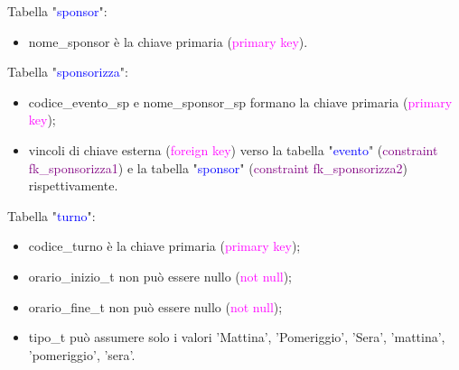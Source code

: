 \documentclass{article}
\begin{document}
     \begin{flushleft}
        Tabella "\textcolor{blue}{sponsor}": \\
        \begin{itemize}
            \item nome\_sponsor è la chiave primaria (\textcolor{magenta}{primary key}). \\
        \end{itemize}        
    \end{flushleft}

    \newpage
    \begin{flushleft}
        Tabella "\textcolor{blue}{sponsorizza}": \\
        \begin{itemize}
            \item codice\_evento\_sp e nome\_sponsor\_sp formano la chiave primaria (\textcolor{magenta}{primary key});
            \item vincoli di chiave esterna (\textcolor{magenta}{foreign key}) verso la tabella "\textcolor{blue}{evento}" (\textcolor{purple}{constraint fk\_sponsorizza1}) e la tabella "\textcolor{blue}{sponsor}" (\textcolor{purple}{constraint fk\_sponsorizza2}) rispettivamente.
        \end{itemize}        
    \end{flushleft}

    \begin{flushleft}
        Tabella "\textcolor{blue}{turno}": \\
        \begin{itemize}
            \item codice\_turno è la chiave primaria (\textcolor{magenta}{primary key}); \\
            \item orario\_inizio\_t non può essere nullo (\textcolor{magenta}{not null}); \\
            \item orario\_fine\_t non può essere nullo (\textcolor{magenta}{not null}); \\
            \item tipo\_t può assumere solo i valori 'Mattina', 'Pomeriggio', 'Sera', 'mattina', 'pomeriggio', 'sera'. \\
        \end{itemize}        
    \end{flushleft}
\end{document}

